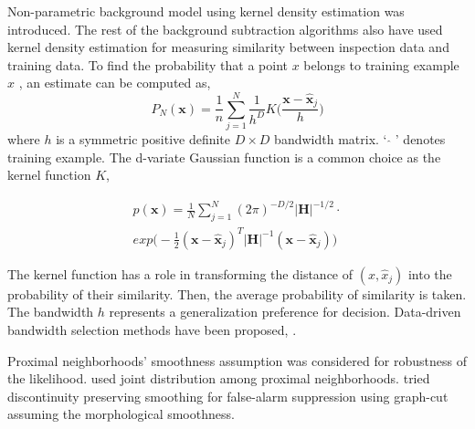 \documentclass[conference]{IEEEtran}
\begin{document}
Non-parametric background model using kernel density estimation \cite{Elgammal} was introduced. The rest of the background subtraction algorithms also have used kernel density estimation for measuring similarity between inspection data and training data. To find the probability that a point $ x $  belongs to training example $ \hat{x} $ , an estimate can be computed as,
\begin{equation}\label{eq:10}
  P_N( \mathbf{x} ) = \frac{1}{n} \sum_{j=1}^N \frac{1}{h^D}K \Big( \frac{ \mathbf{x} - \hat{\mathbf{x}}_j } {h} \Big)
\end{equation}
where \begin{math} h \end{math} is a symmetric positive definite \begin{math} D \times D \end{math} bandwidth matrix. ` \begin{math} \hat{} \end{math} ' denotes training example. The d-variate Gaussian function is a common choice as the kernel function $ K $, 

\begin{equation}\label{eq:20}
 \begin{split}
  p( \mathbf{x} ) = \frac{1}{N} \sum_{j=1}^N (2\pi)^{-D/2} |\mathbf{H}|^{-1/2}  \cdot \\
                    exp \Big( -\frac{1}{2} (\mathbf{x} - \hat{\mathbf{x}}_j)^T |\mathbf{H}|^{-1}  (\mathbf{x} - \hat{\mathbf{x}}_j ) \Big) 
 \end{split}
\end{equation}

The kernel function has a role in transforming the distance of \begin{math} (x , \hat{x}_j) \end{math}  into the probability of their similarity. Then, the average probability of similarity is taken. The bandwidth \begin{math} h \end{math} represents a generalization preference for decision. Data-driven bandwidth selection methods have been proposed, \cite{Jones, Comaniciu}.

Proximal neighborhoods' smoothness assumption was considered for robustness of the likelihood. \cite{Elgammal} used joint distribution among proximal neighborhoods. \cite{Sheikh} tried discontinuity preserving smoothing for false-alarm suppression using graph-cut assuming the morphological smoothness.
\end{document}
